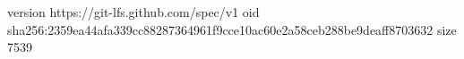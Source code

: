 version https://git-lfs.github.com/spec/v1
oid sha256:2359ea44afa339cc88287364961f9cce10ac60e2a58ceb288be9deaff8703632
size 7539
